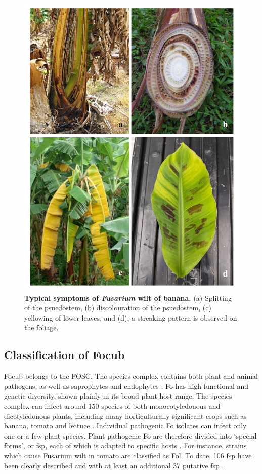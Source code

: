 \begin{figure}[pt!]
    \centering
    \includegraphics[width=15cm]{Figures/SymptomsofFoc.pdf}
    \caption[Typical symptoms of Fusarium  wilt of banana.]{\textbf{Typical symptoms of \textit{Fusarium} wilt of banana.} (a) Splitting of the psuedostem, (b) discolouration of the psuedostem, (c) yellowing of lower leaves, and (d), a streaking pattern is observed on the foliage.}
    \label{fig:FusariumWiltSymptoms}
\end{figure}

\subsection{Classification of \acl{Focub}}

\ac{Focub} belongs to the \ac{FOSC}. The species complex contains both plant and animal pathogens, as well as saprophytes and endophytes \parencite{Leslie2006}. \acs{Fo} has high functional and genetic diversity, shown plainly in its broad plant host range. The species complex can infect around 150 species of both monocotyledonous and dicotyledonous plants, including many horticulturally significant crops such as banana, tomato and lettuce \parencite{Edel-Hermann2019}.  Individual pathogenic \ac{Fo} isolates can infect only one or a few plant species. Plant pathogenic \ac{Fo} are therefore divided into ‘special forms’, or \ac{fsp}, each of which is adapted to specific hosts \parencite{Snyder1940}. For instance, strains which cause Fusarium wilt in tomato are classified as \ac{Fol}. To date, 106 \ac{fsp} have been clearly described and with at least an additional 37 putative \ac{fsp} \parencite{Edel-Hermann2019}.   

